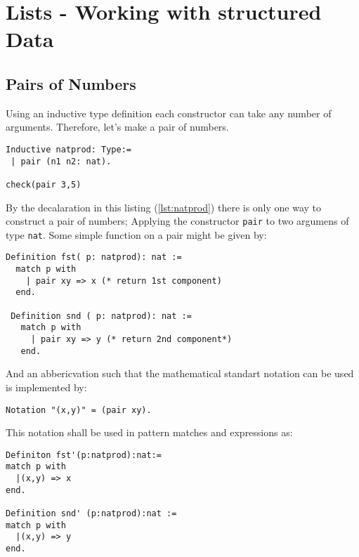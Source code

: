 \section{Lists - Working with structured Data}
\label{sec:ListsWorkingWithStructuredData}

\subsection{Pairs of Numbers}
\label{subsec:PairsOfNumbers}

Using an inductive type definition each constructor can take any number of arguments. 
Therefore, let's make a pair of numbers.

\begin{lstlisting}[caption = \lstinline!natprod!, label = lst:natprod]
Inductive natprod: Type:=
 | pair (n1 n2: nat).

check(pair 3,5)
\end{lstlisting}
By the decalaration in this listing (\ref{lst:natprod}) there is only one way to construct a pair of numbers; 
Applying the constructor \lstinline!pair! to two argumens of type \lstinline!nat!.
Some simple function on a pair might be given by: 
\begin{lstlisting}[caption = \lstinline!fst!, label = lst:fst]
Definition fst( p: natprod): nat :=
  match p with 
    | pair xy => x (* return 1st component)
  end.
 
 Definition snd ( p: natprod): nat :=
   match p with 
     | pair xy => y (* return 2nd component*)
   end.
\end{lstlisting}

And an abbericvation such that the mathematical standart notation can be used is implemented by:
\begin{lstlisting}[caption=\lstinline!pair!-naotation, label = lst:pairNotation]
Notation "(x,y)" = (pair xy).
\end{lstlisting}

This notation shall be used in pattern matches and expressions as: 
\begin{lstlisting}[caption = \lstinline!fst'! and \lstinline!snd'!, label =lst:newNotation ]
Definiton fst'(p:natprod):nat:=
match p with
  |(x,y) => x
end.

Definition snd' (p:natprod):nat :=
match p with
  |(x,y) => y
end.
\end{lstlisting}




